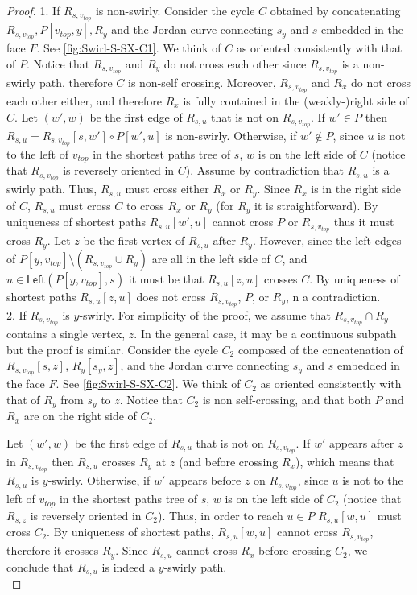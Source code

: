 \documentclass{article}
\newcommand{\Left}{\mathsf{Left}}
\begin{document}
\begin{proof}
1. If $R_{s,v_{top}}$ is non-swirly.
Consider the cycle $C$ obtained by concatenating $R_{s,v_{top}},  P[v_{top},y], R_y$  and the Jordan curve connecting $s_y$ and $s$ embedded in the face $F$. See \cref{fig:Swirl-S-SX-C1}.
We think of $C$ as oriented consistently with that of $P$.
Notice that $R_{s,v_{top}}$ and $R_y$ do not cross each other since $R_{s,v_{top}}$ is a non-swirly path, therefore $C$ is non-self crossing.
Moreover, $R_{s,v_{top}}$ and $R_x$ do not cross each other either, and therefore $R_x$ is fully contained in the (weakly-)right side of $C$.
Let $(w',w)$ be the first edge of $R_{s,u}$ that is not on $R_{s,v_{top}}$.
If $w'\in P$ then $R_{s,u}=R_{s,v_{top}}[s,w']\circ P[w',u]$ is non-swirly.
Otherwise, if $w'\notin P$, since $u$ is not to the left of $v_{top}$ in the shortest paths tree of $s$, $w$ is on the left side of $C$ (notice that $R_{s,v_{top}}$ is reversely oriented in $C$).
Assume by contradiction that $R_{s,u}$ is a swirly path.
Thus, $R_{s,u}$ must cross either $R_x$ or $R_y$.
Since $R_x$ is in the right side of $C$, $R_{s,u}$ must cross $C$ to cross $R_x$ or $R_y$ (for $R_y$ it is straightforward).
By uniqueness of shortest paths $R_{s,u}[w',u]$ cannot cross $P$ or $R_{s,v_{top}}$ thus it must cross $R_y$. Let $z$ be the first vertex of $R_{s,u}$ after $R_y$.
However, since the left edges of $P[y,v_{top}]\setminus (R_{s,v_{top}}\cup R_y)$ are all in the left side of $C$, and $u\in \Left(P[y,v_{top}],s)$ it must be that $R_{s,u}[z,u]$ crosses $C$.
By uniqueness of shortest paths $R_{s,u}[z,u]$ does not cross $R_{s,v_{top}}$, $P$, or $R_y$, n a contradiction.\\

2. If $R_{s,v_{top}}$ is $y$-swirly.
For simplicity of the proof, we assume that $R_{s,v_{top}}\cap R_y$ contains a single vertex, $z$.
In the general case, it may be a continuous subpath but the proof is similar.
Consider the cycle $C_2$ composed of the concatenation of $R_{s,v_{top}}[s,z]$, $R_y[s_y,z]$,  and the Jordan curve connecting $s_y$ and $s$ embedded in the face $F$. See \cref{fig:Swirl-S-SX-C2}.
We think of $C_2$ as oriented  consistently with that of $R_y$ from $s_y$ to $z$.
Notice that $C_2$ is non self-crossing, and that both $P$ and $R_x$ are on the right side of $C_2$.

Let $(w',w)$ be the first edge of $R_{s,u}$ that is not on $R_{s,v_{top}}$.
If $w'$ appears after $z$ in $R_{s,v_{top}}$ then $R_{s,u}$ crosses $R_y$ at $z$ (and before crossing $R_x$), which means that $R_{s,u}$ is $y$-swirly.
Otherwise, if $w'$ appears before $z$ on $R_{s,v_{top}}$, since $u$ is not to the left of $v_{top}$ in the shortest paths tree of $s$, $w$ is on the left side of $C_2$ (notice that $R_{s,z}$ is reversely oriented in $C_2$).
Thus, in order to reach $u\in P$ $R_{s,u}[w,u]$ must cross $C_2$.
By uniqueness of shortest paths,  $R_{s,u}[w,u]$ cannot cross $R_{s,v_{top}}$, therefore it crosses $R_y$.
Since $R_{s,u}$ cannot cross $R_x$ before crossing $C_2$, we conclude that $R_{s,u}$ is indeed a $y$-swirly path.\\


\end{proof}
\end{document}
